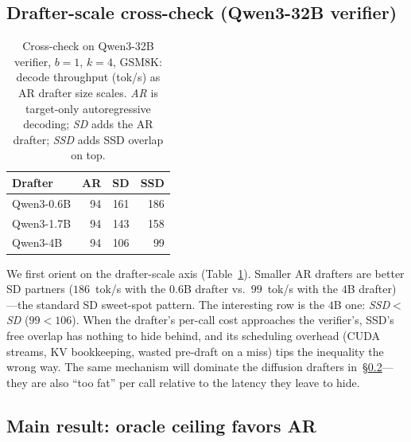 \documentclass{article}
\begin{document}
\subsection{Drafter-scale cross-check (Qwen3-32B verifier)}
\label{ssec:scale}

\begin{table}[t]
  \caption{Cross-check on Qwen3-32B verifier, $b{=}1$, $k{=}4$, GSM8K: decode throughput (tok/s) as AR drafter size scales.
  \emph{AR} is target-only autoregressive decoding; \emph{SD} adds the AR drafter; \emph{SSD} adds SSD overlap on top.}
  \label{tab:ar-scale}
  \begin{center}
    \begin{small}
      \begin{tabular}{@{}lrrr@{}}
        \toprule
        Drafter      & AR  & SD  & SSD \\
        \midrule
        Qwen3-0.6B   & 94  & 161 & 186 \\
        Qwen3-1.7B   & 94  & 143 & 158 \\
        Qwen3-4B     & 94  & 106 &  99 \\
        \bottomrule
      \end{tabular}
    \end{small}
  \end{center}
\end{table}

We first orient on the drafter-scale axis (Table~\ref{tab:ar-scale}).
Smaller AR drafters are better SD partners ($186$~tok/s with the $0.6$B drafter vs.\ $99$~tok/s with the $4$B drafter)---the standard SD sweet-spot pattern.
The interesting row is the $4$B one: \emph{SSD$<$SD} ($99 < 106$).
When the drafter's per-call cost approaches the verifier's, SSD's free overlap has nothing to hide behind, and its scheduling overhead (CUDA streams, KV bookkeeping, wasted pre-draft on a miss) tips the inequality the wrong way.
The same mechanism will dominate the diffusion drafters in~\S\ref{ssec:oracle}---they are also ``too fat'' per call relative to the latency they leave to hide.

\subsection{Main result: oracle ceiling favors AR}
\label{ssec:oracle}
\end{document}
